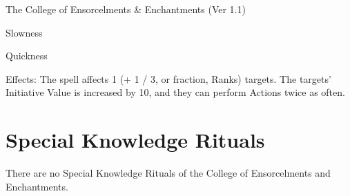 \begin{Chapter}{The College of Ensorcelments \& Enchantments (Ver 1.1)}
\begin{spell}[S-11]{Slowness }
\end{spell}

\begin{spell}[S-12]{Quickness }

Effects:  The  spell  affects  1  (+  1  /  3,  or  fraction, 
Ranks)  targets.  The  targets’  Initiative  Value  is 
increased  by  10,  and  they  can  perform  Actions 
twice as often. 
\end{spell}


\section{Special Knowledge Rituals}

There are no Special Knowledge Rituals of the College of Ensorcelments
and Enchantments.

\end{Chapter}

